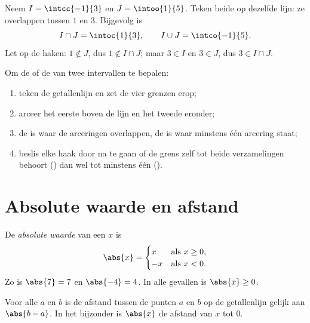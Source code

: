 \begin{example}\label{ex:g10:numbers:interunion}
Neem $I = \intcc{-1}{3}$ en $J = \intoo{1}{5}$. Teken beide op dezelfde
lijn: ze overlappen tussen $1$ en $3$. Bijgevolg is
\[
I \cap J = \intoc{1}{3},
\qquad
I \cup J = \intco{-1}{5}.
\]
Let op de haken: $1 \notin J$, dus $1 \notin I \cap J$; maar $3 \in I$ en
$3 \in J$, dus $3 \in I \cap J$.
\end{example}

\begin{method}\label{met:g10:numbers:intervals}
Om de  of de  van twee intervallen te bepalen:
\begin{enumerate}
  \item teken de getallenlijn en zet de vier grenzen erop;
  \item arceer het eerste  boven de lijn en het tweede eronder;
  \item de  is waar de arceringen overlappen, de  is waar
        minstens één arcering staat;
  \item beslis elke haak door na te gaan of de grens zelf tot beide
        verzamelingen behoort () dan wel tot minstens één
        ().
\end{enumerate}
\end{method}

\section{Absolute waarde en afstand}

\begin{definition}\label{def:g10:numbers:abs}
De \emph{absolute waarde} van een  $x$ is
\[
\abs{x} =
\begin{cases}
x & \text{als } x \geq 0, \\
-x & \text{als } x < 0.
\end{cases}
\]
Zo is $\abs{7} = 7$ en $\abs{-4} = 4$. In alle gevallen is $\abs{x} \geq 0$.
\end{definition}

\begin{proposition}\label{prop:g10:numbers:distance}
Voor alle  $a$ en $b$ is de afstand tussen de punten $a$ en $b$
op de getallenlijn gelijk aan $\abs{b - a}$. In het bijzonder is $\abs{x}$ de
afstand van $x$ tot $0$.
\end{proposition}

